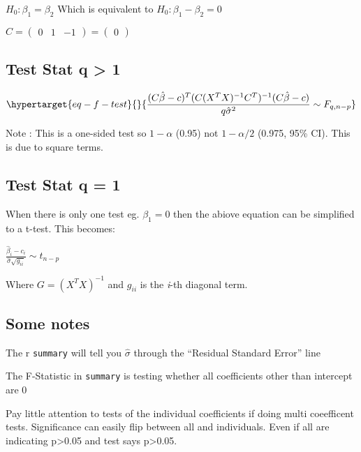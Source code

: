 \documentclass[
  letterpaper,
  DIV=11,
  numbers=noendperiod]{scrreprt}
\begin{document}
\hfill\break

\(H_0 : \beta_1 = \beta_2\) Which is equivalent to
\(H_0 : \beta_1 - \beta_2 = 0\)

\(C = \begin{pmatrix} 0 & 1 & -1 \end{pmatrix} = \begin{pmatrix} 0 \end{pmatrix}\)

\hypertarget{test-stat-q-1}{%
\subsection{Test Stat q \textgreater{} 1}\label{test-stat-q-1}}

\begin{equation}\protect\hypertarget{eq-f-test}{}{\frac{(C \hat{\beta} -c )^T(C(X^TX)^{-1}C^T)^{-1}(C \hat{\beta} -c )}{q\hat{\sigma}^2} \sim F_{q, n-p}}\label{eq-f-test}\end{equation}

Note : This is a one-sided test so \(1-\alpha\) (0.95) not
\(1-\alpha / 2\) (0.975, 95\% CI). This is due to square terms.

\hypertarget{test-stat-q-1-1}{%
\subsection{Test Stat q = 1}\label{test-stat-q-1-1}}

When there is only one test eg. \(\beta_1=0\) then the abiove equation
can be simplified to a t-test. This becomes:

\(\frac{\hat{\beta}_i - c_i}{\hat{\sigma} \sqrt{g_{ii}}} \sim t_{n-p}\)

Where \(G = (X^TX)^{-1}\) and \(g_{ii}\) is the \emph{i}-th diagonal
term.

\hypertarget{some-notes}{%
\subsection{Some notes}\label{some-notes}}

The r \texttt{summary} will tell you \(\hat{\sigma}\) through the
``Residual Standard Error'' line

The F-Statistic in \texttt{summary} is testing whether all coefficients
other than intercept are 0

Pay little attention to tests of the individual coefficients if doing
multi coeefficent tests. Significance can easily flip between all and
individuals. Even if all are indicating p\textgreater0.05 and test says
p\textgreater0.05.
\end{document}
